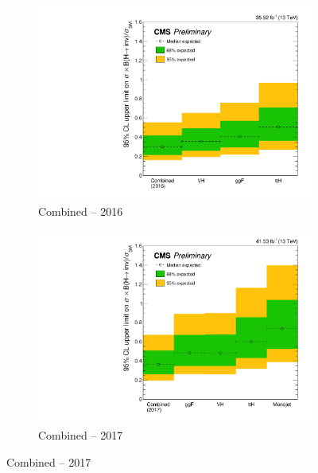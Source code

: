 \begin{figure}[htbp]
    \centering
    \begin{subfigure}[b]{0.45\textwidth}
        \includegraphics[width=\textwidth]{figures/limits/limit_2016_comb_Scenario4.pdf}
        \caption{Combined -- 2016}
    \end{subfigure}
    \hfill
    \begin{subfigure}[b]{0.45\textwidth}
        \includegraphics[width=\textwidth]{figures/limits/limit_2017_comb_Scenario4.pdf}
        \caption{Combined -- 2017}
    \end{subfigure}


\end{figure}
